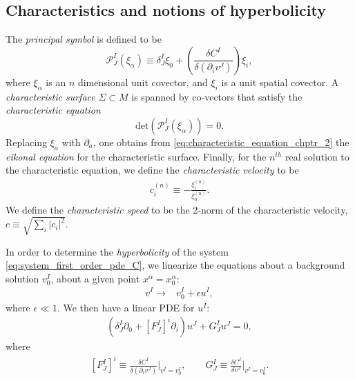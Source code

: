 \documentclass{ws-ijmpd}
\begin{document}
\subsection{Characteristics and notions of hyperbolicity
\label{sec:characteristics_hyperbolicity}
}
The \emph{principal symbol} is defined to be
\begin{equation}
   \mathcal{P}^I_J\left(\xi_{\alpha}\right)
   \equiv 
   \delta^I_J\xi_0
   +
   \left(
      \frac{
         \delta C^I
      }{
         \delta(\partial_iv^J)
      }
   \right)
   \xi_i
   ,
\end{equation}
where $\xi_{\alpha}$ is an $n$ dimensional unit covector,
and $\xi_i$ is a unit spatial covector.
A \emph{characteristic
surface} $\Sigma\subset M$ is spanned by
co-vectors that satisfy the \emph{characteristic equation}
\begin{equation}
\label{eq:characteristic_equation_chptr_2}
   \mathrm{det}\left(\mathcal{P}^I_J\left(\xi_{\alpha}\right)\right)
   = 
   0
   .
\end{equation}
   Replacing $\xi_a$ with $\partial_a$, one
obtains from \eqref{eq:characteristic_equation_chptr_2}
the \emph{eikonal equation} 
for the characteristic surface\cite{christodoulou2008mathematical}. 
Finally, for the $n^{th}$ real solution to the characteristic equation,
we define the \emph{characteristic velocity} to be
\begin{align}
   c_i^{(n)} 
   \equiv
   -
   \frac{\xi_i^{(n)}}{\xi_0^{(n)}}
   .
\end{align}
We define the \emph{characteristic speed} to be the 2-norm of the
characteristic velocity, $c\equiv \sqrt{\sum_i |c_i|^2}$.

In order to determine the \emph{hyperbolicity} of the
system \eqref{eq:system_first_order_pde_C}, we linearize the equations
about a background solution $v_0^I$, about a given point 
$x^{\alpha}=x_0^{\alpha}$:
\begin{align}
   v^I
   \to&
   v^I_0 + \epsilon u^I
   ,
\end{align}
where $\epsilon\ll1$.
We then have a linear PDE for $u^I$: 
\begin{align}
\label{eq:general_linearized_equation}
   \left(
      \delta^I_J
      \partial_0
      +
      \left[F^I_J\right]^i\partial_i
   \right)
   u^J
   +
   G^I_Ju^J
   =
   0
   ,
\end{align}
where
\begin{align}
   \left[F^I_J\right]^i
   \equiv
   \frac{\delta C^I}{\delta \left(\partial_iv^J\right)}\Bigg|_{v^I=v^I_0}
   ,\qquad
   G^I_J
   \equiv
   \frac{\delta C^I}{\delta v^J}\Bigg|_{v^I=v^I_0}
   .
\end{align}
\end{document}
